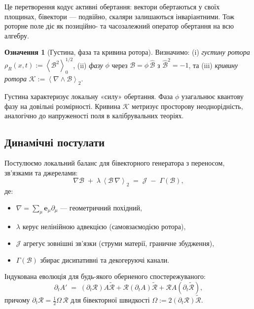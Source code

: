 \documentclass[11pt,a4paper]{article}
\newcommand{\e}{\mathbf{e}}
\newcommand{\grade}[2]{\left\langle #1 \right\rangle_{#2}}
\newcommand{\scal}[1]{\grade{#1}{0}}
\newcommand{\biv}[1]{\grade{#1}{2}}
\newcommand{\rev}[1]{\widetilde{#1}}           %
\newcommand{\Rotor}{\mathcal{R}}
\newcommand{\Biv}{\mathcal{B}}
\newcommand{\D}{\nabla}                        %
\theoremstyle{definition}
\newtheorem{definition}{Означення}
\theoremstyle{plain}
\theoremstyle{remark}
\begin{document}
Це перетворення кодує активні обертання: вектори обертаються у своїх площинах, бівектори — подвійно, скаляри залишаються інваріантними. Тож роторне поле діє як позиційно- та часозалежний оператор обертання на всю алгебру.

\begin{definition}[Густина, фаза та кривина ротора]
Визначимо: (i) \emph{густину ротора} $\rho_R(x,t):=\scal{\Biv^2}^{1/2}$, (ii) \emph{фазу} $\phi$ через $\Biv=\phi\,\hat{\Biv}$ з $\hat{\Biv}^2=-1$, та (iii) \emph{кривину ротора} $\mathcal{K}:=\biv{\D \wedge \Biv}$.
\end{definition}

Густина характеризує локальну «силу» обертання. Фаза $\phi$ узагальнює квантову фазу на довільні розмірності. Кривина $\mathcal{K}$ метризує просторову неоднорідність, аналогічно до напруженості поля в калібрувальних теоріях.

\subsection{Динамічні постулати}

Постулюємо локальний баланс для бівекторного генератора з переносом, зв’язками та джерелами:
\begin{equation}
  \D \Biv \;+\; \lambda\, \biv{\Biv\,\D} \;=\; \mathcal{J} \;-\; \Gamma(\Biv),
  \label{eq:rotor-dynamics}
\end{equation}
де:
\begin{itemize}[leftmargin=*,itemsep=2pt]
  \item $\D = \sum_\mu \e_\mu \partial_\mu$ — геометричний похідний,
  \item $\lambda$ керує нелінійною адвекцією (самовзаємодією ротора),
  \item $\mathcal{J}$ агрегує зовнішні зв’язки (струми матерії, граничне збудження),
  \item $\Gamma(\Biv)$ збирає дисипативні та декогеруючі канали.
\end{itemize}

Індукована еволюція для будь-якого оберненого спостережуваного:
\begin{equation}
  \partial_t A' \;=\; \left(\partial_t \Rotor\right) A \rev{\Rotor} + \Rotor \left(\partial_t A\right)\rev{\Rotor} + \Rotor A \left(\partial_t\rev{\Rotor}\right),
\end{equation}
причому $\partial_t \Rotor = \frac{1}{2}\Omega\,\Rotor$ для бівекторної швидкості $\Omega:=2(\partial_t \Rotor)\rev{\Rotor}$.
\end{document}
